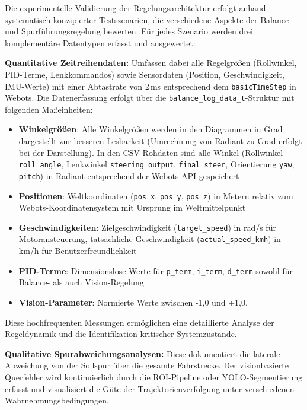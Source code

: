   Die experimentelle Validierung der Regelungsarchitektur erfolgt anhand systematisch konzipierter 
  Testszenarien, die verschiedene Aspekte der Balance- und Spurführungsregelung bewerten. Für jedes 
  Szenario werden drei komplementäre Datentypen erfasst und ausgewertet:
  
  \textbf{Quantitative Zeitreihendaten:} Umfassen dabei alle Regelgrößen (Rollwinkel, PID-Terme, Lenkkommandos) 
  sowie Sensordaten (Position, Geschwindigkeit, IMU-Werte) mit einer Abtastrate von 2\,ms entsprechend dem 
  \texttt{basicTimeStep} in Webots. Die Datenerfassung erfolgt über die \texttt{balance\_log\_data\_t}-Struktur 
  mit folgenden Maßeinheiten:
  
  \begin{itemize}
    \item \textbf{Winkelgrößen}: Alle Winkelgrößen werden in den Diagrammen in Grad dargestellt zur besseren Lesbarkeit 
    (Umrechnung von Radiant zu Grad erfolgt bei der Darstellung). In den CSV-Rohdaten sind alle 
    Winkel (Rollwinkel \texttt{roll\_angle}, Lenkwinkel \texttt{steering\_output}, \texttt{final\_steer}, 
    Orientierung \texttt{yaw}, \texttt{pitch}) in Radiant entsprechend der Webots-API gespeichert
    \item \textbf{Positionen}: Weltkoordinaten (\texttt{pos\_x}, \texttt{pos\_y}, \texttt{pos\_z}) in Metern 
    relativ zum Webots-Koordinatensystem mit Ursprung im Weltmittelpunkt
    \item \textbf{Geschwindigkeiten}: Zielgeschwindigkeit (\texttt{target\_speed}) in rad/s für Motoransteuerung, 
    tatsächliche Geschwindigkeit (\texttt{actual\_speed\_kmh}) in km/h für Benutzerfreundlichkeit
    \item \textbf{PID-Terme}: Dimensionslose Werte für \texttt{p\_term}, \texttt{i\_term}, \texttt{d\_term} 
    sowohl für Balance- als auch Vision-Regelung
    \item \textbf{Vision-Parameter}: Normierte Werte zwischen -1,0 und +1,0.
  \end{itemize}
  
  Diese hochfrequenten Messungen ermöglichen eine detaillierte Analyse der Regeldynamik und die Identifikation kritischer Systemzustände.
  
  \textbf{Qualitative Spurabweichungsanalysen: } Diese dokumentiert die laterale Abweichung von der Sollspur 
  über die gesamte Fahrstrecke. Der visionbasierte Querfehler wird kontinuierlich durch die ROI-Pipeline 
  oder YOLO-Segmentierung erfasst und visualisiert die Güte der Trajektorienverfolgung unter verschiedenen Wahrnehmungsbedingungen.
  
